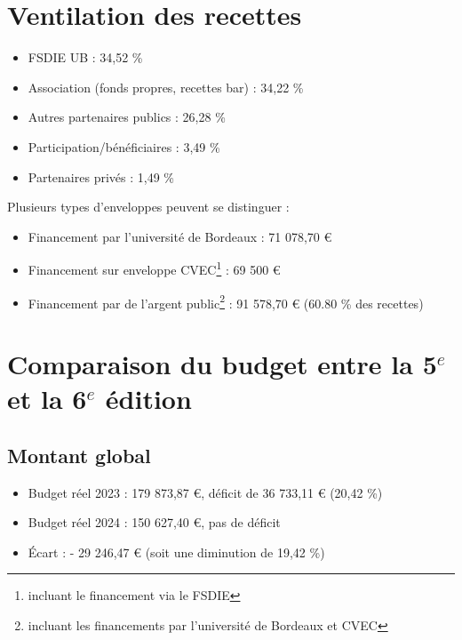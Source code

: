 \documentclass[12pt,a4paper]{report}
\begin{document}
\section{Ventilation des recettes}
\begin{itemize}
\item FSDIE UB : 34,52 \%
\item Association (fonds propres, recettes bar) : 34,22 \%
\item Autres partenaires publics : 26,28 \%
\item Participation/bénéficiaires : 3,49 \%
\item Partenaires privés : 1,49 \%\\
\end{itemize}

Plusieurs types d'enveloppes peuvent se distinguer : 
\begin{itemize}
\item Financement par l'université de Bordeaux : 71 078,70 €
\item Financement sur enveloppe CVEC\footnote{incluant le financement via le FSDIE} : 69 500 €
\item Financement par de l'argent public\footnote{incluant les financements par l'université de Bordeaux et CVEC} : 91 578,70 € (60.80 \% des recettes)
\end{itemize}

\section{Comparaison du budget entre la 5$^e$ et la 6$^e$ édition}
\subsection{Montant global}
\begin{itemize}
\item Budget réel 2023 : 179 873,87 €, déficit de 36 733,11 € (20,42 \%)
\item Budget réel 2024 : 150 627,40 €, pas de déficit
\item Écart : - 29 246,47 € (soit une diminution de 19,42 \%)
\end{itemize}
\end{document}
